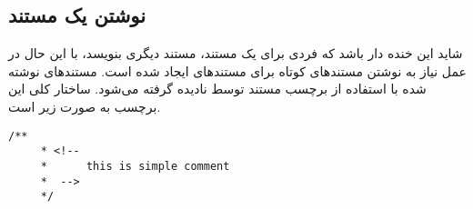 \subsection{نوشتن یک مستند} 
شاید این خنده دار باشد که فردی برای یک مستند، مستند دیگری بنویسد، با این حال در عمل نیاز به نوشتن
مستندهای کوتاه برای مستندهای ایجاد شده است. مستندهای نوشته شده با استفاده از برچسب مستند 
توسط  نادیده گرفته می‌شود. ساختار کلی این برچسب به صورت زیر است.
\begin{latin}
\lstset{language=C++}  
\begin{lstlisting}[frame=single] 
    /**
     * <!--
     * 		this is simple comment
     *  -->
     */
\end{lstlisting}
\end{latin}